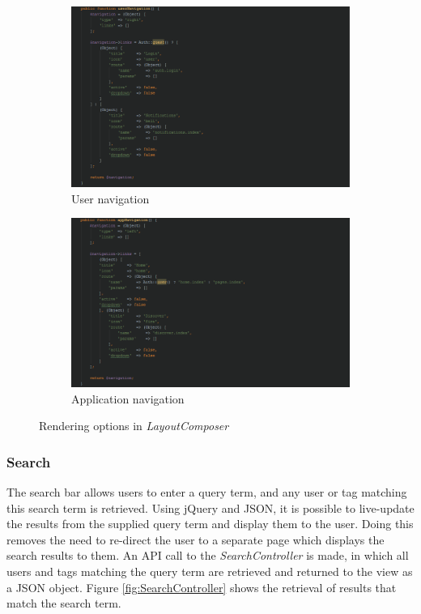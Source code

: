 \begin{figure}[H]
\centering
\begin{subfigure}[b]{1\linewidth}
	\includegraphics[width=1\textwidth]{Images/Implementation/UserNavigation}
	\caption{User navigation}
	\label{fig:UserNavigation}
\end{subfigure}
\begin{subfigure}[b]{1\linewidth}
	\includegraphics[width=1\textwidth]{Images/Implementation/AppNavigation}
	\caption{Application navigation}
	\label{fig:AppNavigation}
\end{subfigure}
\caption{Rendering options in \emph{LayoutComposer}}
\label{fig:LayoutComposerNav}
\end{figure}

\subsubsection{Search}
The search bar allows users to enter a query term, and any user or tag matching this search term is retrieved. Using jQuery and JSON, it is possible to live-update the results from the supplied query term and display them to the user. Doing this removes the need to re-direct the user to a separate page which displays the search results to them. An API call to the \textit{SearchController} is made, in which all users and tags matching the query term are retrieved and returned to the view as a JSON object. Figure \ref{fig:SearchController} shows the retrieval of results that match the search term.

